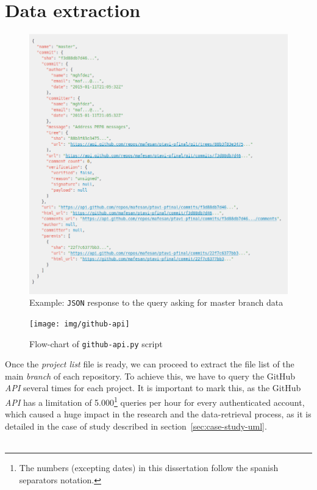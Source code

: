 \documentclass[a4paper, 12pt]{book}
\begin{document}
\section{Data extraction}
\label{sec:data-extraction}
\begin{figure}
  \centering
  \includegraphics[width=13cm, keepaspectratio]{img/gh-api-master-json-example}
  \caption{Example: \texttt{JSON} response to the query asking for master branch data}
  \label{fig:gh-api-master-json}
\end{figure}
\begin{figure}
  \centering
  \texttt{[image: img/github-api]}
  \caption{Flow-chart of \texttt{github-api.py} script}
  \label{fig:gh-api-diagram}
\end{figure}
Once the \emph{project list} file is ready, we can proceed to extract the file list of the main \textit{branch} of each
repository. To achieve this, we have to query the GitHub \textit{API} several times for each project.
It is important to mark this, as the GitHub \textit{API} has a limitation of
5.000\footnote{The numbers (excepting dates) in this dissertation follow the spanish separators notation.}
queries per hour for every authenticated account, which caused a huge impact in the research and the data-retrieval
process, as it is detailed in the case of study described in section~\ref{sec:case-study-uml}.\\\\
\end{document}
